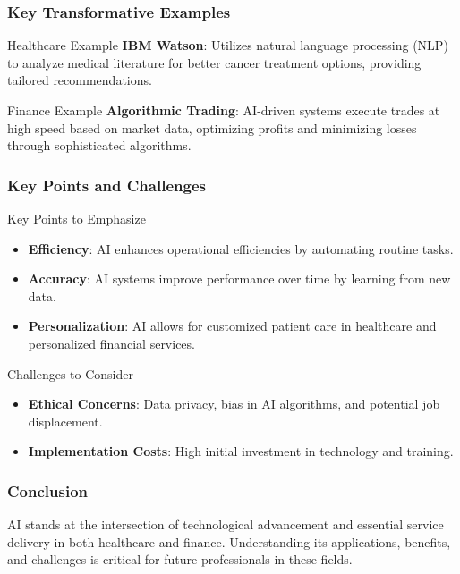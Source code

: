 \documentclass[aspectratio=169]{beamer}
\begin{document}
\begin{frame}[fragile]
    \frametitle{Key Transformative Examples}
    \begin{block}{Healthcare Example}
        \textbf{IBM Watson}: Utilizes natural language processing (NLP) to analyze medical literature for better cancer treatment options, providing tailored recommendations.
    \end{block}

    \begin{block}{Finance Example}
        \textbf{Algorithmic Trading}: AI-driven systems execute trades at high speed based on market data, optimizing profits and minimizing losses through sophisticated algorithms.
    \end{block}
\end{frame}

\begin{frame}[fragile]
    \frametitle{Key Points and Challenges}
    \begin{block}{Key Points to Emphasize}
        \begin{itemize}
            \item \textbf{Efficiency}: AI enhances operational efficiencies by automating routine tasks.
            \item \textbf{Accuracy}: AI systems improve performance over time by learning from new data.
            \item \textbf{Personalization}: AI allows for customized patient care in healthcare and personalized financial services.
        \end{itemize}
    \end{block}

    \begin{block}{Challenges to Consider}
        \begin{itemize}
            \item \textbf{Ethical Concerns}: Data privacy, bias in AI algorithms, and potential job displacement.
            \item \textbf{Implementation Costs}: High initial investment in technology and training.
        \end{itemize}
    \end{block}
\end{frame}

\begin{frame}[fragile]
    \frametitle{Conclusion}
    AI stands at the intersection of technological advancement and essential service delivery in both healthcare and finance. 
    Understanding its applications, benefits, and challenges is critical for future professionals in these fields.
\end{frame}
\end{document}
